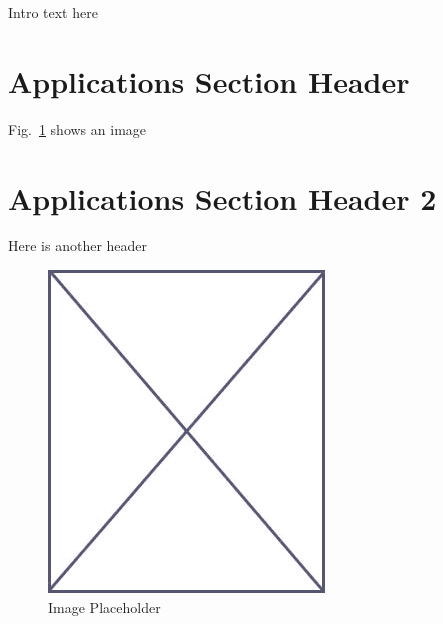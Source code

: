 Intro text here

\section{Applications Section Header}
\label{sec:app_sec_1}

Fig.~\ref{fig:placeholder_app} shows an image

\section{Applications Section Header 2}
\label{sec:app_sec_2}

Here is another header


\begin{figure}
\begin{center}
\vspace{-32pt}
\includegraphics[scale=.45]{figs/placeholder}
\end{center}
\vspace{-12pt}
\caption{Image Placeholder}
\label{fig:placeholder_app}
\end{figure}
